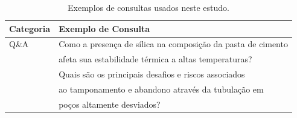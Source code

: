             
            \begin{table}[h]
                \centering
                \caption{Exemplos de consultas usados neste estudo. }
                \begin{tabular}{l l }
                    \toprule %
                    \textbf{Categoria} & \textbf{Exemplo de Consulta} \\ 
                    \midrule %
                    Q\&A & Como a presença de sílica na composição da pasta de cimento \\
                         & \quad afeta sua estabilidade térmica a altas temperaturas? \\ 
                         & Quais são os principais desafios e riscos associados\\
                         &  \quad ao tamponamento e abandono através da tubulação em\\
                         &  \quad poços altamente desviados? \\ 
            

\end{tabular}
\end{table}
